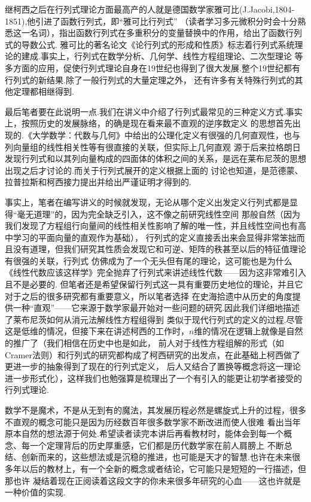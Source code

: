 继柯西之后在行列式理论方面最高产的人就是德国数学家雅可比(J.Jacobi,1804-1851),他引进了函数行列式，即``雅可比行列式''
（读者学习多元微积分时会十分熟悉这一名词），指出函数行列式在多重积分的变量替换中的作用，给出了函数行列式的导数公式.
雅可比的著名论文《论行列式的形成和性质》标志着行列式系统理论的建成.事实上，行列式在数学分析、几何学、线性方程组理论、二次型理论
等多方面的应用，促使行列式理论自身在19世纪也得到了很大发展.整个19世纪都有行列式的新结果.除了一般行列式的大量定理之外，
还有许多有关特殊行列式的其他定理都相继得到.

最后笔者要在此说明一点.我们在讲义中介绍了行列式最常见的三种定义方式.事实上，按照历史的发展脉络，的确是现在看来最不直观的逆序数定义
的思想首先出现的.《大学数学：代数与几何》中给出的公理化定义有很强的几何直观性，也与列向量组的线性相关性等有很直接的关联，但实际上几何直观
源于后来拉格朗日发现行列式和以其列向量构成的四面体的体积之间的关系，是远在莱布尼茨的思想出现之后才讨论的.而关于行列式展开的定义根据上面的
讨论也知道，是范德蒙、拉普拉斯和柯西接力提出并给出严谨证明才得到的.

事实上，笔者在编写讲义的时候就发现，无论从哪个定义出发定义行列式都是显得``毫无道理''的，因为完全缺乏引入，这不像之前研究线性空间
那般自然（因为我们发现了方程组行向量间的线性相关性影响了解的唯一性，并且线性空间也有高中学习的平面向量的直观作为基础），
行列式的定义直接丢出来会显得非常笨拙而且没有道理，但我们研究其性质会发现它和可逆、矩阵的秩甚至以后的特征值理论有很强的关联，行列式
仿佛成为了一个无头但有尾的理论，这可能也是为什么《线性代数应该这样学》完全抛弃了行列式来讲述线性代数——因为这非常难引入且不是必要的.
但笔者还是希望保留行列式这一具有重要历史地位的理论，并且它对于之后的很多研究都有重要意义，所以笔者选择
在史海拾遗中从历史的角度提供一种``直观''——它来源于数学家最开始对一些问题的研究.因此我们详细地描述了莱布尼茨如何从消元法解线性方程组得到
类似于现代行列式的定义的过程.尽管这是低维的情况，但接下来在讲述柯西的工作时，$n$维的情况在逻辑上就像是自然的推广了（我们相信在历史中也是如此，
前人对于线性方程组解的形式（如Cramer法则）和行列式的研究都构成了柯西研究的出发点，在此基础上柯西做了更进一步的抽象得到了现在的行列式定义，
后人又结合了置换等概念将这一理论进一步形式化），这样我们也勉强算是梳理出了一个有引入的能更让初学者接受的行列式理论.

数学不是魔术，不是从无到有的魔法，其发展历程必然是螺旋式上升的过程，很多不直观的概念可能只是因为历经数百年很多数学家不断改进而使人很难
看出当年原本自然的想法源于何处.希望读者读完本讲后再看教材时，能体会到每一个概念、每一个定理背后的历史厚重感，它们都是历代数学家在前人肩膀上
不断总结、创新而来的，这些想法或是沉稳的推进，也可能是天才的智慧.也许在未来很多年以后的教材上，有一个全新的概念或者结论，它可能只是短短的一行描述，但那也许
凝结着现在正阅读着这段文字的你未来很多年研究的心血——这也许就是一种价值的实现.


